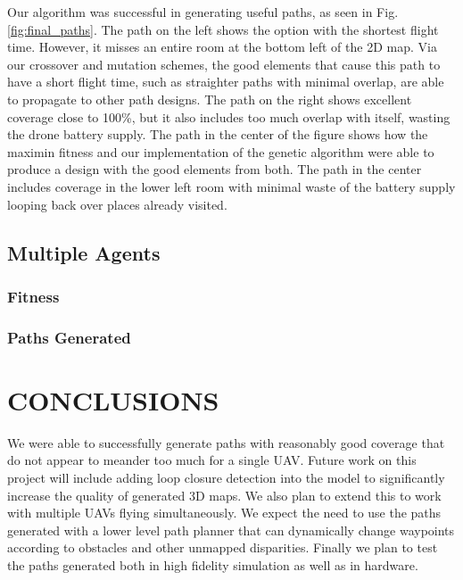 \documentclass[letterpaper, 10 pt, conference]{ieeeconf}  %
\begin{document}
Our algorithm was successful in generating useful paths, as seen in Fig. \ref{fig:final_paths}. The path on the left shows the option with the shortest flight time. However, it misses an entire room at the bottom left of the 2D map. Via our crossover and mutation schemes, the good elements that cause this path to have a short flight time, such as straighter paths with minimal overlap, are able to propagate to other path designs. The path on the right shows excellent coverage close to 100\%, but it also includes too much overlap with itself, wasting the drone battery supply. The path in the center of the figure shows how the maximin fitness and our implementation of the genetic algorithm were able to produce a design with the good elements from both. The path in the center includes coverage in the lower left room with minimal waste of the battery supply looping back over places already visited.


\subsection{Multiple Agents}
\subsubsection{Fitness}
\subsubsection{Paths Generated}
\section{CONCLUSIONS}\label{conclusions}

We were able to successfully generate paths with reasonably good coverage that do not appear to meander too much for a single UAV. Future work on this project will include adding loop closure detection into the model to significantly increase the quality of generated 3D maps. We also plan to extend this to work with multiple UAVs flying simultaneously. We expect the need to use the paths generated with a lower level path planner that can dynamically change waypoints according to obstacles and other unmapped disparities. Finally we plan to test the paths generated both in high fidelity simulation as well as in hardware.



\end{document}
